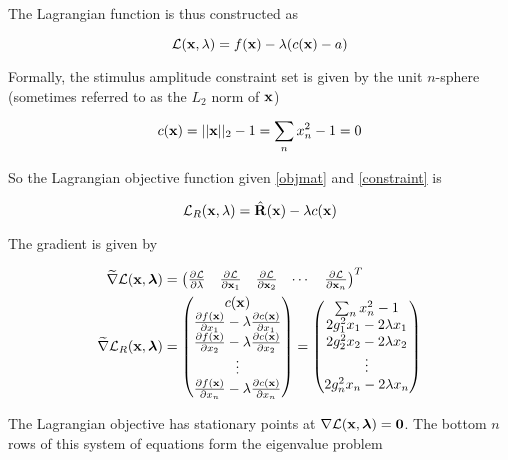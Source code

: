 \documentclass{article}
\newcommand{\Lagr}{\mathcal{L}}
\newcommand{\vect}[1]{\textbf{\textrm{#1}}}
\newcommand{\pd}[2]{\frac{\partial {#1}}{\partial {#2}}}
\begin{document}
The Lagrangian function is thus constructed as

\begin{equation} \label{lagrangian}
	\Lagr(\vect{x},\lambda) = f(\vect{x}) - \lambda(c(\vect{x}) - a)
\end{equation}

Formally, the stimulus amplitude constraint set is given by the unit $n$-sphere (sometimes referred to as the $L_2$ norm of $\vect{x}$)

\begin{equation} \label{constraint}
	c(\vect{x}) = ||\vect{x}||_2 - 1 = \sum_n{x_n^2} - 1 = 0
\end{equation}

So the Lagrangian objective function given \eqref{objmat} and \eqref{constraint} is

\begin{equation}
	\Lagr_R(\vect{x},\lambda) = \hat{\vect{R}}(\vect{x}) - \lambda c(\vect{x})
\end{equation}

The gradient is given by

\begin{align} \label{lagrgrad}
	\widetilde{\nabla} \Lagr(\vect{x},\bm{\lambda}) & = 
	\begin{pmatrix}
		\pd{\Lagr}{\lambda} & \pd{\Lagr}{\vect{x}_1} & \pd{\Lagr}{\vect{x}_2} 
		& \cdots & \pd{\Lagr}{\vect{x}_n}
	\end{pmatrix}^{T} \\
	\widetilde{\nabla} \Lagr_R(\vect{x},\bm{\lambda})& = 
	\begin{pmatrix}
		c(\vect{x}) \\
		\pd{f(\vect{x})}{x_1} - \lambda \pd{c(\vect{x})}{x_1} \\
		\pd{f(\vect{x})}{x_2} - \lambda \pd{c(\vect{x})}{x_2}	\\	
		\vdots \\
		\pd{f(\vect{x})}{x_n} - \lambda \pd{c(\vect{x})}{x_n}
	\end{pmatrix} = 
	\begin{pmatrix}
		\sum_n{x_n^2} - 1 \\
		2 g_1^2 x_1 - 2 \lambda x_1 \\
		2 g_2^2 x_2 - 2 \lambda x_2 \\
		\vdots \\
		2 g_n^2 x_n - 2 \lambda x_n
	\end{pmatrix} \nonumber
\end{align}

The Lagrangian objective has stationary points at $\nabla \Lagr(\vect{x},\bm{\lambda}) = \vect{0}$.
The bottom $n$ rows of this system of equations form the eigenvalue problem
\end{document}
